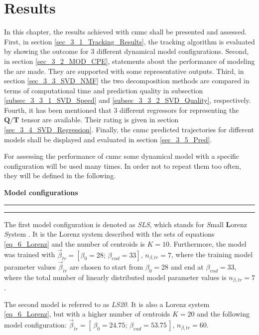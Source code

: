 \chapter{Results}
\label{ch_3}
In this chapter, the results achieved with \gls{cnmc} shall be presented and assessed.
First, in section \ref{sec_3_1_Tracking_Results}, the tracking algorithm is evaluated by showing the outcome for 3 different dynamical model configurations.
Second, in section \ref{sec_3_2_MOD_CPE}, statements about the performance of modeling the  are made. 
They are supported with some representative outputs. 
Third, in section \ref{sec_3_3_SVD_NMF} the two decomposition methods are compared in terms of computational time and prediction quality in subsection \ref{subsec_3_3_1_SVD_Speed} and \ref{subsec_3_3_2_SVD_Quality}, respectively.
Fourth, it has been mentioned that 3 different regressors for representing the $\bm Q / \bm T$ tensor are available. 
Their rating is given in  section \ref{sec_3_4_SVD_Regression}.
Finally, the \gls{cnmc} predicted trajectories for different models shall be displayed and evaluated in section \ref{sec_3_5_Pred}.\newline


For assessing the performance of \gls{cnmc} some dynamical model with a specific configuration will be used many times. 
In order not to repeat them too often, they will be defined in the following.\newline 

 \textbf{Model configurations}
 \hrule
 \vspace{0.05cm}
 \hrule
 \vspace{0.25cm}
 The first model configuration is denoted as  \emph{SLS}, which stands for \textsl{S}mall \textbf{L}orenz \textsl{S}ystem .
 It is the Lorenz system described with the sets of equations \eqref{eq_6_Lorenz} and the number of centroids is $K=10$. 
 Furthermore, the model was trained with $\vec{\beta }_{tr} = [\beta_0 = 28 ; \, \beta_{end} = 33], \, n_{\beta, tr} = 7$, where the training model parameter values $\vec{\beta}_{tr}$ are chosen to start from $\beta_0 = 28$ and end at $\beta_{end} = 33$, where the total number of linearly distributed model parameter values is $n_{\beta, tr} = 7$.\newline

 The second model is referred to as \emph{LS20}. 
 It is also a Lorenz system \eqref{eq_6_Lorenz}, but with a higher number of centroids $K=20$ and the following model configuration: $\vec{\beta }_{tr} = [\, \beta_0 = 24.75 ; \, \beta_{end} = 53.75  \,], \, n_{\beta, tr} = 60$.\newline

